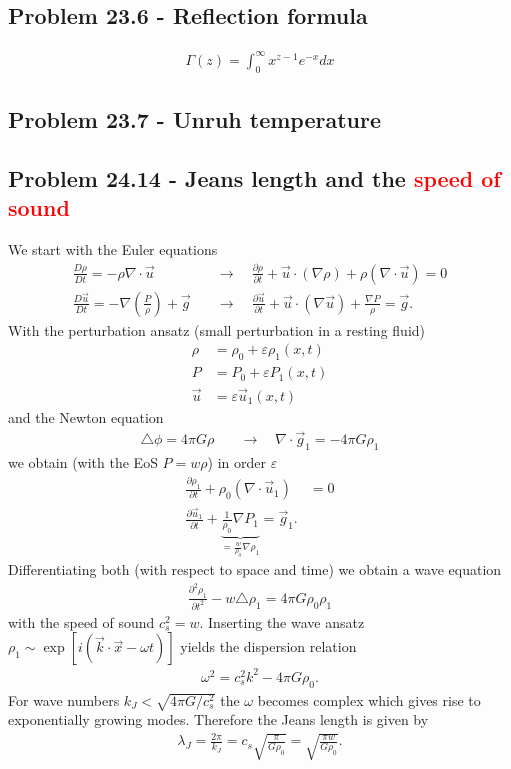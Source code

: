 \documentclass[10pt,a4paper]{book}
\theoremstyle{definition}
\begin{document}
\subsection{Problem 23.6 - Reflection formula}
\begin{align}
    \Gamma(z)=\int_0^\infty x^{z-1}e^{-x}dx
\end{align}



\subsection{Problem 23.7 - Unruh temperature}

\subsection{Problem 24.14 - Jeans length and the \textcolor{red}{speed of sound}}
We start with the Euler equations
\begin{align}
    \frac{D\rho}{Dt}=-\rho\nabla\cdot\vec{u}\quad&\rightarrow\quad\frac{\partial\rho}{\partial t}+\vec{u}\cdot(\nabla\rho)+\rho(\nabla\cdot\vec{u})=0\\
    \frac{D\vec{u}}{Dt}=-\nabla\left(\frac{P}{\rho}\right)+\vec{g}\quad&\rightarrow\quad\frac{\partial\vec{u}}{\partial t}+\vec{u}\cdot(\nabla\vec{u})+\frac{\nabla P}{\rho}=\vec{g}.
\end{align}
With the perturbation ansatz (small perturbation in a resting fluid)
\begin{align}
    \rho&=\rho_0+\varepsilon \rho_1(x,t)\\
    P&=P_0+\varepsilon P_1(x,t)\\
    \vec{u}&=\varepsilon \vec{u}_1(x,t)
\end{align}
and the Newton equation
\begin{align}
    \triangle\phi=4\pi G\rho\quad&\rightarrow\quad\nabla\cdot\vec{g}_1=-4\pi G\rho_1
\end{align}
we obtain (with the EoS $P=w\rho$) in order $\varepsilon$
\begin{align}
    \frac{\partial\rho_1}{\partial t}+\rho_0(\nabla\cdot\vec{u}_1)&=0\\
    \frac{\partial\vec{u}_1}{\partial t}+\underbrace{\frac{1}{\rho_0}\nabla P_1}_{=\frac{w}{\rho_0}\nabla\rho_1}=\vec{g}_1.
\end{align}
Differentiating both (with respect to space and time) we obtain a wave equation
\begin{align}
    \frac{\partial^2\rho_1}{\partial t^2}-w\triangle\rho_1=4\pi G\rho_0\rho_1
\end{align}
with the speed of sound $c_s^2=w$. Inserting the wave ansatz $\rho_1\sim\exp[i(\vec{k}\cdot\vec{x}-\omega t)]$ yields the dispersion relation
\begin{align}
    \omega^2=c_s^2k^2-4\pi G\rho_0.
\end{align}
For wave numbers $k_J<\sqrt{4\pi G/c_s^2}$ the $\omega$ becomes complex which gives rise to exponentially growing modes. Therefore the Jeans length is given by
\begin{align}
    \lambda_J=\frac{2\pi}{k_J}=c_s\sqrt{\frac{\pi}{G\rho_0}}=\sqrt{\frac{\pi w}{G\rho_0}}.
\end{align}
\end{document}
